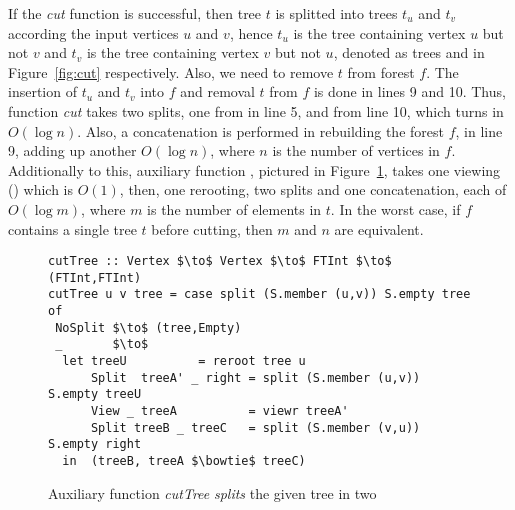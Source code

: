 If the \textit{cut} function is successful, then tree $t$ is splitted into trees $t_u$ and $t_v$ according the input vertices $u$ and $v$, hence $t_u$ is the tree containing vertex $u$ but not $v$ and $t_v$ is the tree containing vertex $v$ but not $u$, denoted as trees  and  in Figure~\ref{fig:cut} respectively. Also, we need to remove $t$ from forest $f$. The insertion of $t_u$ and $t_v$ into $f$ and removal $t$ from $f$ is done in lines 9 and 10. Thus, function \textit{cut} takes two splits, one from  in line 5, and from line 10, which turns in $O(\log n)$. Also, a concatenation is performed in rebuilding the forest $f$, in line 9, adding up another $O(\log n)$, where $n$ is the number of vertices in $f$. Additionally to this, auxiliary function , pictured in Figure~\ref{fig:cutTree}, takes one viewing () which is $O(1)$, then, one rerooting, two splits and one concatenation, each of $O(\log m)$, where $m$ is the number of elements in $t$. In the worst case, if $f$ contains a single tree $t$ before cutting, then $m$ and $n$ are equivalent.

\begin{figure}
\begin{lstlisting}[mathescape] 
cutTree :: Vertex $\to$ Vertex $\to$ FTInt $\to$ (FTInt,FTInt) 
cutTree u v tree = case split (S.member (u,v)) S.empty tree of
 NoSplit $\to$ (tree,Empty) 
 _       $\to$ 
  let treeU          = reroot tree u 
      Split  treeA' _ right = split (S.member (u,v)) S.empty treeU
      View _ treeA          = viewr treeA' 
      Split treeB _ treeC   = split (S.member (v,u)) S.empty right 
  in  (treeB, treeA $\bowtie$ treeC) 
\end{lstlisting} 
\caption{Auxiliary function \textit{cutTree} \textit{splits} the given tree in two}
\label{fig:cutTree}
\end{figure}



